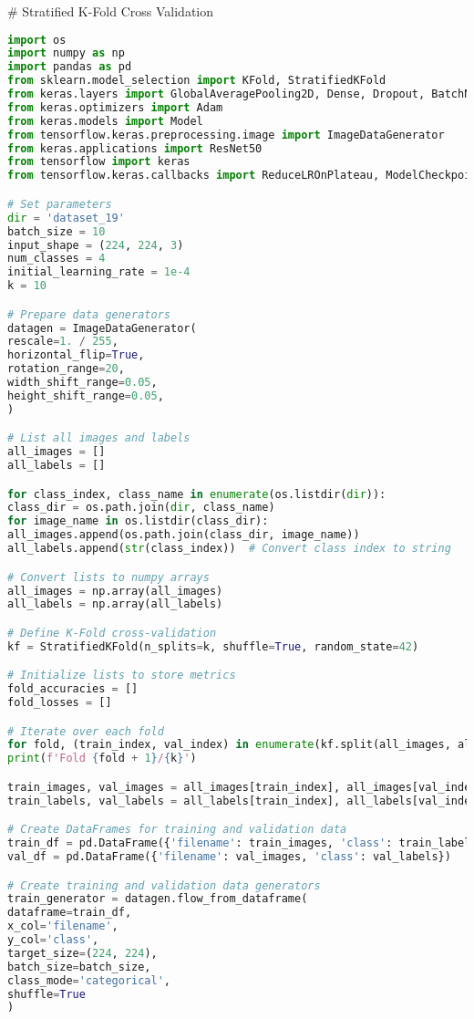 # Stratified K-Fold Cross Validation
\begin{lstlisting}[language=Python]
import os
import numpy as np
import pandas as pd
from sklearn.model_selection import KFold, StratifiedKFold
from keras.layers import GlobalAveragePooling2D, Dense, Dropout, BatchNormalization
from keras.optimizers import Adam
from keras.models import Model
from tensorflow.keras.preprocessing.image import ImageDataGenerator
from keras.applications import ResNet50
from tensorflow import keras
from tensorflow.keras.callbacks import ReduceLROnPlateau, ModelCheckpoint, EarlyStopping

# Set parameters
dir = 'dataset_19'
batch_size = 10
input_shape = (224, 224, 3)
num_classes = 4
initial_learning_rate = 1e-4
k = 10

# Prepare data generators
datagen = ImageDataGenerator(
rescale=1. / 255,
horizontal_flip=True,
rotation_range=20,
width_shift_range=0.05,
height_shift_range=0.05,
)

# List all images and labels
all_images = []
all_labels = []

for class_index, class_name in enumerate(os.listdir(dir)):
class_dir = os.path.join(dir, class_name)
for image_name in os.listdir(class_dir):
all_images.append(os.path.join(class_dir, image_name))
all_labels.append(str(class_index))  # Convert class index to string

# Convert lists to numpy arrays
all_images = np.array(all_images)
all_labels = np.array(all_labels)

# Define K-Fold cross-validation
kf = StratifiedKFold(n_splits=k, shuffle=True, random_state=42)

# Initialize lists to store metrics
fold_accuracies = []
fold_losses = []

# Iterate over each fold
for fold, (train_index, val_index) in enumerate(kf.split(all_images, all_labels)):
print(f'Fold {fold + 1}/{k}')

train_images, val_images = all_images[train_index], all_images[val_index]
train_labels, val_labels = all_labels[train_index], all_labels[val_index]

# Create DataFrames for training and validation data
train_df = pd.DataFrame({'filename': train_images, 'class': train_labels})
val_df = pd.DataFrame({'filename': val_images, 'class': val_labels})

# Create training and validation data generators
train_generator = datagen.flow_from_dataframe(
dataframe=train_df,
x_col='filename',
y_col='class',
target_size=(224, 224),
batch_size=batch_size,
class_mode='categorical',
shuffle=True
)


\end{lstlisting}
